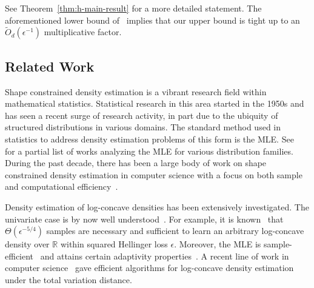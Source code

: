 \documentclass[final,12pt]{colt2018}
\newtheorem{informal theorem}[theorem]{Theorem (informal statement)}
\newcommand{\R}{\mathbb{R}}
\newcommand{\eps}{\epsilon}
\begin{document}
\noindent See Theorem~\ref{thm:h-main-result} for a more detailed statement.
The aforementioned lower bound of~\cite{KimSam16} implies
that our upper bound is tight up to an $\tilde{O}_d (\eps^{-1})$ multiplicative factor.








\subsection{Related Work} \label{ssec:related}
Shape constrained density estimation is a vibrant research field within mathematical statistics. 
Statistical research in this area started in the 1950s and has seen a recent surge of
research activity, in part due to the ubiquity of structured distributions in various domains. 
The standard method used in statistics to address density estimation problems of this form 
is the MLE.
See~\cite{Brunk:58, PrakasaRao:69, Wegman:70, 
HansonP:76, Groeneboom:85, Birge:87, Birge:87b,Fougeres:97,ChanTong:04,BW07aos, JW:09, 
DumbgenRufibach:09, BRW:09aos, GW09sc, BW10sn, KoenkerM:10aos, Walther09, ChenSam13, KimSam16, BalDoss14, HW16}
for a partial list of works analyzing the MLE for various distribution families.
During the past decade, there has been a large body of work on shape constrained density estimation 
in computer science with a focus on both sample and computational efficiency~\cite{DDS12soda, DDS12stoc, DDOST13focs, CDSS13, CDSS14, CDSS14b, 
ADHLS15, ADLS17, DKS15, DKS15b, DDKT15, DKS16, VV16, DiakonikolasKS17-lc}.

Density estimation of log-concave densities has been extensively investigated.
The univariate case is by now well understood~\cite{DL:01, CDSS14, ADLS17, KimSam16, HW16}. 
For example, it is known~\cite{KimSam16, HW16} that $\Theta(\eps^{-5/4})$ samples
are necessary and sufficient to learn an arbitrary log-concave density over $\R$ within squared Hellinger loss $\eps$.
Moreover, the MLE is sample-efficient~\cite{KimSam16, HW16} 
and attains certain adaptivity properties~\cite{KGS16}. A recent line of work in computer 
science~\cite{CDSS13, CDSS14, ADLS17, CanonneDGR16, DKS16-proper-lc}
gave efficient algorithms for log-concave density estimation 
under the total variation distance. 
\end{document}
